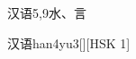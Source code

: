 \begin{entry}{汉语}{5,9}{⽔、⾔}
  \begin{phonetics}{汉语}{han4yu3}[][HSK 1]
  \end{phonetics}
\end{entry}
